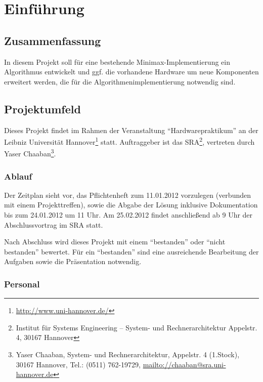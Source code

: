\chapter{Einführung}
\label{chapter:Pflichtenheft-Einfuehrung}

\section{Zusammenfassung}
\label{section:Pflichtenheft-Einfuehrung-Zusammenfassung}

In diesem Projekt soll für eine bestehende Minimax-Implementierung ein Algorithmus entwickelt und ggf. die vorhandene Hardware um neue Komponenten erweitert werden, die für die Algorithmenimplementierung notwendig sind.

\section{Projektumfeld}
\label{section:Pflichtenheft-Einfuehrung-Projektumfeld}

Dieses Projekt findet im Rahmen der Veranstaltung "`Hardwarepraktikum"' an der Leibniz Universität Hannover\footnote{\url{http://www.uni-hannover.de/}} statt. Auftraggeber ist das SRA\footnote{Institut für Systems Engineering -- System- und Rechnerarchitektur Appelstr. 4, 30167 Hannover}, vertreten durch Yaser Chaaban\footnote{Yaser Chaaban, System- und Rechnerarchitektur, Appelstr. 4 (1.Stock), 30167 Hannover, Tel.: (0511) 762-19729, \url{mailto://chaaban@sra.uni-hannover.de}}.

\subsection{Ablauf}
\label{subsection:Pflichtenheft-Einfuehrung-Projektumfeld-Ablauf}

Der Zeitplan sieht vor, das Pflichtenheft zum 11.01.2012 vorzulegen (verbunden mit einem Projekttreffen), sowie die Abgabe der Lösung inklusive Dokumentation bis zum 24.01.2012 um 11 Uhr. Am 25.02.2012 findet anschließend ab 9 Uhr der Abschlussvortrag im SRA statt.

Nach Abschluss wird dieses Projekt mit einem "`bestanden"' oder "`nicht bestanden"' bewertet. Für ein "`bestanden"' sind eine ausreichende Bearbeitung der Aufgaben sowie die Präsentation notwendig.

\subsection{Personal}
\label{subsection:Pflichtenheft-Einfuehrung-Projektumfeld-Personal}

